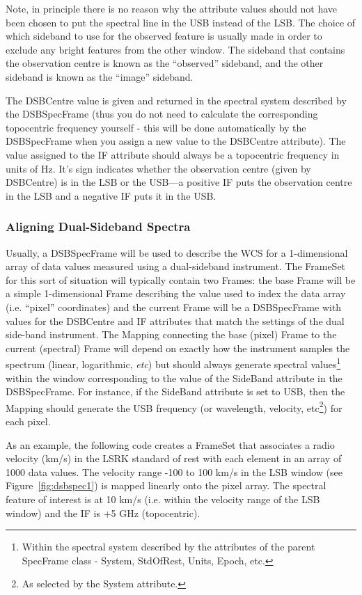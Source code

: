 \documentclass[twoside,11pt]{starlink}
\begin{document}
Note, in principle there is no reason why the attribute values should not
have been chosen to put the spectral line in the USB instead of the LSB.
The choice of which sideband to use for the observed feature is usually
made in order to exclude any bright features from the other window. The
sideband that contains the observation centre is known as the ``observed''
sideband, and the other sideband is known as the ``image'' sideband.

The DSBCentre value is given and returned in the spectral system
described by the DSBSpecFrame (thus you do not need to calculate the
corresponding topocentric frequency yourself - this will be done
automatically by the DSBSpecFrame when you assign a new value to the
DSBCentre attribute). The value assigned to the IF attribute should
always be a topocentric frequency in units of Hz. It's sign indicates
whether the observation centre (given by DSBCentre) is in the LSB or the
USB---a positive IF puts the observation centre in the LSB and a negative
IF puts it in the USB.


\subsubsection{Aligning Dual-Sideband Spectra}
Usually, a DSBSpecFrame will be used to describe the WCS for a
1-dimensional array of data values measured using a dual-sideband
instrument. The FrameSet for this sort of situation will typically
contain two Frames: the base Frame will be a simple 1-dimensional Frame
describing the value used to index the data array (i.e. ``pixel''
coordinates) and the current Frame will be a DSBSpecFrame with values for
the DSBCentre and IF attributes that match the settings of the dual
side-band instrument. The Mapping connecting the base (pixel) Frame to
the current (spectral) Frame will depend on exactly how the instrument
samples the spectrum (linear, logarithmic, \emph{etc}) but should always
generate spectral values\footnote{Within the spectral system described by
the attributes of the parent SpecFrame class - System, StdOfRest, Units,
Epoch, etc.} within the window corresponding to the value of the SideBand
attribute in the DSBSpecFrame. For instance, if the SideBand attribute is
set to USB, then the Mapping should generate the USB
frequency (or wavelength, velocity, etc\footnote{As selected by the
System attribute.}) for each pixel.

As an example, the following code creates a FrameSet that associates a
radio velocity (km/s) in the LSRK standard of rest with each element
in an array of 1000 data values. The velocity range -100 to 100 km/s in
the LSB window (see Figure~\ref{fig:dsbspec1}) is mapped linearly onto the
pixel array. The spectral feature of interest is at 10 km/s (i.e. within the
velocity range of the LSB window) and the IF is +5 GHz (topocentric).
\end{document}
